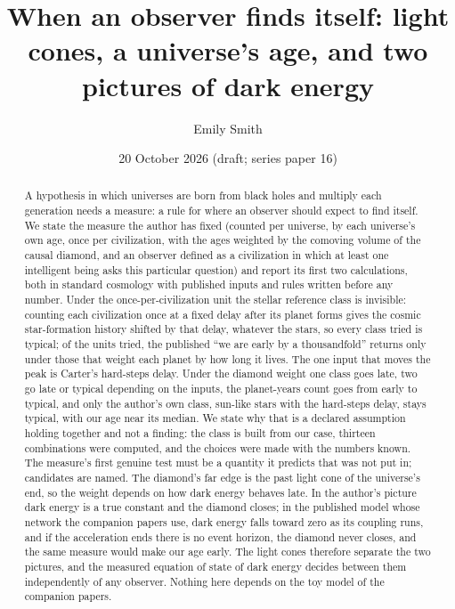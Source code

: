\documentclass[pre,twocolumn,superscriptaddress,nofootinbib]{revtex4-2}
\begin{document}
\title{When an observer finds itself: light cones, a universe's age, and two pictures of dark energy}

\author{Emily Smith}

\date{20 October 2026 (draft; series paper 16)}

\begin{abstract}
A hypothesis in which universes are born from black holes and multiply each generation needs a measure: a rule for
where an observer should expect to find itself. We state the measure the author has fixed (counted per universe, by
each universe's own age, once per civilization, with the ages weighted by the comoving volume of the causal diamond,
and an observer defined as a civilization in which at least one intelligent being asks this particular question) and
report its first two calculations, both in standard cosmology with published inputs and rules written before any number. Under the
once-per-civilization unit the stellar reference class is invisible: counting each civilization once at a fixed delay
after its planet forms gives the cosmic star-formation history shifted by that delay, whatever the stars, so every class
tried is typical; of the units tried, the published ``we are early by a thousandfold'' returns only under those that
weight each planet by how long it lives. The one input that moves the peak is Carter's hard-steps delay. Under the
diamond weight one class goes late, two go late or typical depending on the inputs, the planet-years count goes from
early to typical, and only the author's own class, sun-like stars with the hard-steps delay, stays typical, with our
age near its median. We state why that is a declared assumption holding together and not a finding: the class is built
from our case, thirteen combinations were computed, and the choices were made with the numbers known. The
measure's first genuine test must be a quantity it predicts that was not put in; candidates are named. The diamond's
far edge is the past light cone of the universe's end, so the weight depends on how dark energy behaves late. In the
author's picture dark energy is a true constant and the diamond closes; in the published model whose network the
companion papers use, dark energy falls toward zero as its coupling runs, and if the acceleration ends there is no
event horizon, the diamond never closes, and the same measure would make our age early. The light cones therefore
separate the two pictures, and the measured equation of state of dark energy decides between them independently of any
observer. Nothing here depends on the toy model of the companion papers.
\end{abstract}
\end{document}

